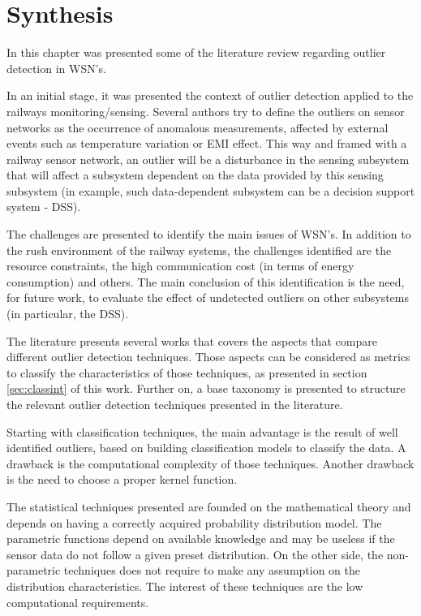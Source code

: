 \newpage
\section{Synthesis}
\label{sec:synth}


In this chapter was presented some of the literature review regarding outlier detection in WSN's.

In an initial stage, it was presented the context of outlier detection applied to the railways monitoring/sensing.
Several authors try to define the outliers on sensor networks as the occurrence of anomalous measurements, affected by external events such as temperature variation or EMI effect.
This way and framed with a railway sensor network, an outlier will be a disturbance in the sensing subsystem that will affect a subsystem dependent on the data provided by this sensing subsystem (in example, such data-dependent subsystem can be a decision support system - DSS).

The challenges are presented to identify the main issues of WSN's. In addition to the rush environment of the railway systems, the challenges identified are the resource constraints, the high communication cost (in terms of energy consumption) and others. The main conclusion of this identification is the need, for future work, to evaluate the effect of undetected outliers on other subsystems (in particular, the DSS).

The literature presents several works that covers the aspects that compare different outlier detection techniques. Those aspects can be considered as metrics to classify the characteristics of those techniques, as presented in section \ref{sec:classint} of this work. Further on, a base taxonomy is presented to structure the relevant outlier detection techniques presented in the literature.

Starting with classification techniques, the main advantage is the result of well identified outliers, based on building classification models to classify the data. A drawback is the computational complexity of those techniques. Another drawback is the need to choose a proper kernel function.

The statistical techniques presented are founded on the mathematical theory and depends on having a correctly acquired probability distribution model. The parametric functions depend on available knowledge and may be useless if the sensor data do not follow a given preset distribution.  On the other side, the non-parametric techniques does not require to make any assumption on the distribution characteristics. The interest of these techniques are the low computational requirements.

